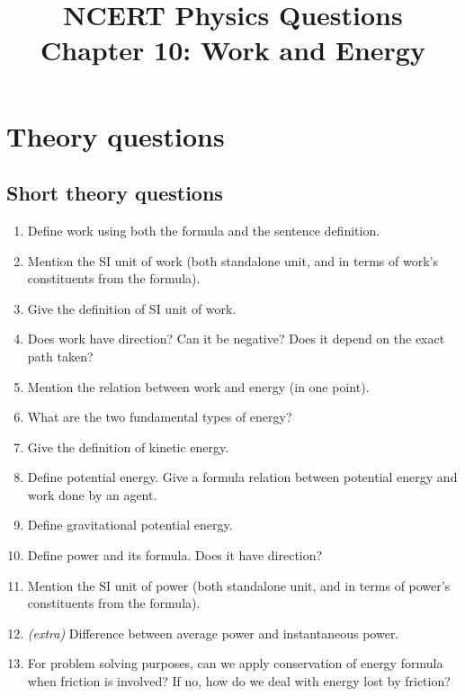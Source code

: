 \documentclass[12pt]{article}
\title{NCERT Physics Questions \\ Chapter 10: Work and Energy}
\author{}
\date{}
\begin{document}
\maketitle

\section*{Theory questions}
\subsection*{Short theory questions}
\begin{enumerate}
	\item Define work using both the formula and the sentence definition.
	\item Mention the SI unit of work (both standalone unit, and in terms of work's constituents from the formula).
	\item Give the definition of SI unit of work.
	\item Does work have direction? Can it be negative? Does it depend on the exact path taken?
	\item Mention the relation between work and energy (in one point).
	\item What are the two fundamental types of energy?
	\item Give the definition of kinetic energy.
	\item Define potential energy. Give a formula relation between potential energy and work done by an agent.
	\item Define gravitational potential energy.
	\item Define power and its formula. Does it have direction?
	\item Mention the SI unit of power (both standalone unit, and in terms of power's constituents from the formula).
	\item \textit{(extra)} Difference between average power and instantaneous power.
	\item For problem solving purposes, can we apply conservation of energy formula when friction is involved? If no, how do we deal with energy lost by friction?
\end{enumerate}
\end{document}
